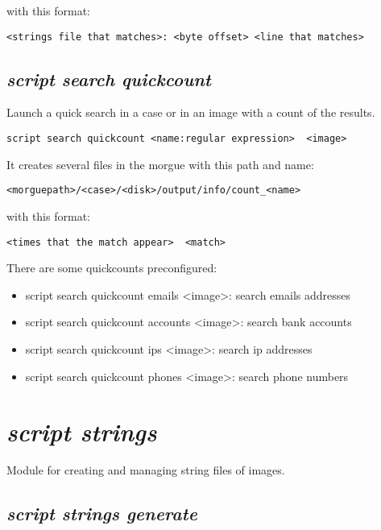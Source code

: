 \documentclass[a4paper,11pt,oneside]{report}
\begin{document}
with this format:

\begin{verbatim}
<strings file that matches>: <byte offset> <line that matches>
\end{verbatim}



\subsection{\emph{script search quickcount}}

Launch a quick search in a case or in an image with a count of the results.

\begin{verbatim}
script search quickcount <name:regular expression>  <image>
\end{verbatim}

It creates several files in the morgue with this path and name:

\begin{verbatim}
<morguepath>/<case>/<disk>/output/info/count_<name>
\end{verbatim}

with this format:

\begin{verbatim}
<times that the match appear>  <match>
\end{verbatim}

There are some quickcounts preconfigured:

\begin{itemize}
\item script search quickcount emails <image>: search emails addresses
\item script search quickcount accounts <image>: search bank accounts
\item script search quickcount ips <image>: search ip addresses
\item script search quickcount phones <image>: search phone numbers
\end{itemize}




\section{\emph{script strings}}

Module for creating and managing string files of images.

\subsection{\emph{script strings generate}} 
\end{document}
